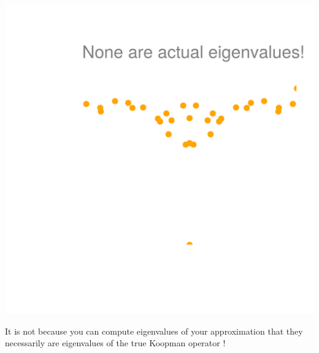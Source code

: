 \documentclass[aspectratio=169, usenames, dvipsnames]{beamer}
\begin{document}
\begin{frame}
  \vfill
  \begin{minipage}{.36\textwidth}
    \centering
    \includegraphics[width=\textwidth]{Lorenz_eigenvalues_residual}
  \end{minipage}%
  \hfill
  \begin{minipage}{.6\textwidth}
    It is not because you can compute eigenvalues of your approximation that they necessarily are eigenvalues of the true Koopman operator !
  \end{minipage}
  \vfill
\end{frame}
\end{document}
